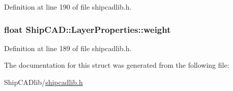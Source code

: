 Definition at line 190 of file shipcadlib.\+h.

\subsubsection[{\texorpdfstring{weight}{weight}}]{\setlength{\rightskip}{0pt plus 5cm}float Ship\+C\+A\+D\+::\+Layer\+Properties\+::weight}\hypertarget{structShipCAD_1_1LayerProperties_a4e9844dd95994725401ad93c5c3a00e9}{}\label{structShipCAD_1_1LayerProperties_a4e9844dd95994725401ad93c5c3a00e9}


Definition at line 189 of file shipcadlib.\+h.



The documentation for this struct was generated from the following file\+:\begin{DoxyCompactItemize}
\item 
Ship\+C\+A\+Dlib/\hyperlink{shipcadlib_8h}{shipcadlib.\+h}\end{DoxyCompactItemize}
